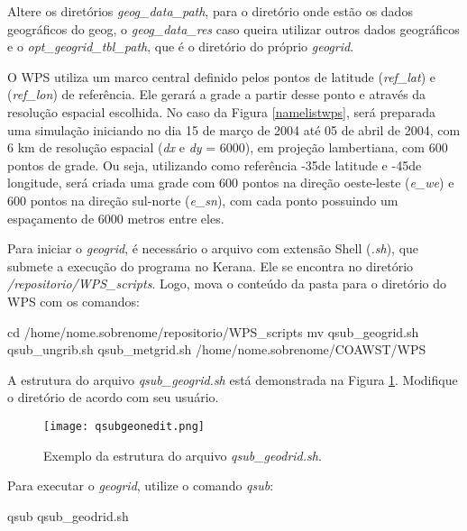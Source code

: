\noindent Altere os diretórios \textit{geog\_data\_path}, para o diretório onde estão os dados geográficos do geog, o \textit{geog\_data\_res} caso queira utilizar outros dados geográficos e o \textit{opt\_geogrid\_tbl\_path}, que é o diretório do próprio \textit{geogrid}.
\bigskip

\noindent O WPS utiliza um marco central definido pelos pontos de latitude (\textit{ref\_lat}) e (\textit{ref\_lon}) de referência. 
          Ele gerará a grade a partir desse ponto e através da resolução espacial escolhida. 
          No caso da Figura \textcolor{bleu_cite}{\ref{namelistwps}}, será preparada uma simulação iniciando no 
          dia 15 de março de 2004 até 05 de abril de 2004, com 6 km de resolução espacial (\textit{dx} e \textit{dy} = 6000),
          em projeção lambertiana, com 600 pontos de grade. Ou seja, utilizando como referência -35\degree de latitude e -45\degree de longitude,
          será criada uma grade com 600 pontos na direção oeste-leste (\textit{e\_we}) e 600 pontos na direção sul-norte (\textit{e\_sn}), com cada 
          ponto possuindo um espaçamento de 6000 metros entre eles.
\bigskip

\noindent Para iniciar o \textit{geogrid}, é necessário o arquivo com extensão Shell (\textit{.sh}), que submete a execução do programa no Kerana. Ele se encontra no diretório \textit{/repositorio/WPS\_scripts}. Logo, mova o conteúdo da pasta para o diretório do WPS com os comandos:
\bigskip

\begin{bashcode}[fontsize=\footnotesize]
cd /home/nome.sobrenome/repositorio/WPS_scripts
mv qsub_geogrid.sh qsub_ungrib.sh qsub_metgrid.sh /home/nome.sobrenome/COAWST/WPS
\end{bashcode}
\bigskip

\noindent A estrutura do arquivo \textit{qsub\_geogrid.sh} está demonstrada na Figura \textcolor{bleu_cite}{\ref{qsubgeonedit}}. Modifique o diretório de acordo com seu usuário.
\bigskip

\begin{figure}[H]
    \centering
    \texttt{[image: qsubgeonedit.png]}
    \caption{Exemplo da estrutura do arquivo \textit{qsub\_geodrid.sh}.}
    \label{qsubgeonedit}
\end{figure}
\bigskip

\noindent Para executar o \textit{geogrid}, utilize o comando \textit{qsub}:
\bigskip

\begin{bashcode}
qsub qsub_geodrid.sh
\end{bashcode}
\bigskip

